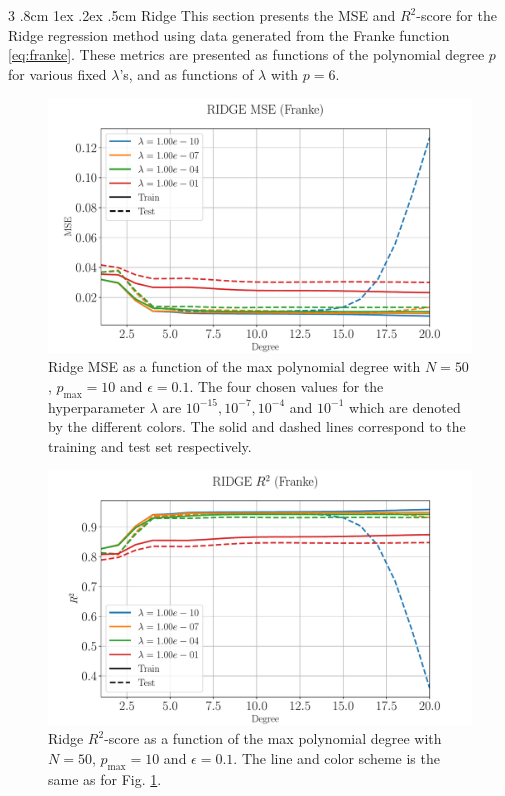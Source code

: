 \documentclass[%
reprint,
amsmath,amssymb,
aps,
pra,
]{revtex4-2}
\makeatletter
\renewcommand{\subsubsection}{%
	\@startsection
	{subsubsection}%
	{3}%
	{\z@}%
	{.8cm \@plus1ex \@minus .2ex}%
	{.5cm}%
	{\normalfont\small\centering}%
}
\makeatother
\begin{document}
\subsubsection{Ridge}
This section presents the MSE and \(R^2\)-score for the Ridge regression method using data generated from the Franke function \eqref{eq:franke}. These metrics are presented as functions of the polynomial degree \(p\) for various fixed \(\lambda \)'s, and as functions of \(\lambda\) with \(p=6\).
\begin{figure}[H]
	\centering
	\includegraphics[width=\linewidth]{Python/Figures/Ridge/RIDGE_MSE_no_scaling.pdf}
	\caption{Ridge MSE as a function of the max polynomial degree with \(N=50\), \(p_{\text{max}}=10\) and \(\epsilon=0.1\). The four chosen values for the hyperparameter $\lambda$ are $10^{-15},10^{-7},10^{-4}$ and $10^{-1}$ which are denoted by the different colors. The solid and dashed lines correspond to the training and test set respectively.}
	\label{fig:ridge_mse_degree}
\end{figure}
\begin{figure}[H]
	\centering
	\includegraphics[width=\linewidth]{Python/Figures/Ridge/RIDGE_R2_no_scaling.pdf}
	\caption{Ridge $R^2$-score as a function of the max polynomial degree with \(N=50\), \(p_{\text{max}}=10\) and \(\epsilon=0.1\). The line and color scheme is the same as for Fig. \ref{fig:ridge_mse_degree}.}
	\label{fig:ridge_r2_degree}
\end{figure}
\end{document}
